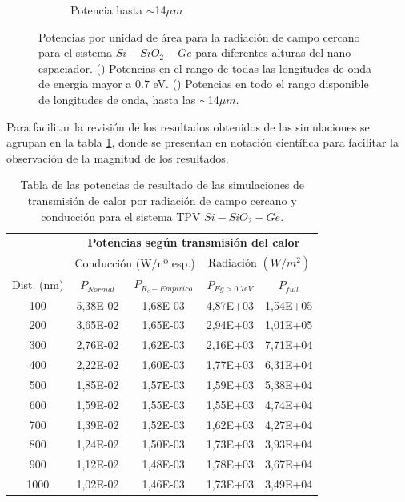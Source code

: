 \begin{figure}[H]
\begin{subfigure}[b]{0.49\textwidth}
	\caption{Potencia hasta $\sim$14$\mu m$}
	\label{fig:p_full_SiGe}
\end{subfigure}
	\caption[Potencias por unidad de área para la radiación de campo cercano para el sistema $Si-SiO_2-Ge$ para diferentes alturas del nano-espaciador]{Potencias por unidad de área para la radiación de campo cercano para el sistema $Si-SiO_2-Ge$ para diferentes alturas del nano-espaciador. () Potencias en el rango de todas las longitudes de onda de energía mayor a 0.7 eV. () Potencias en todo el rango disponible de longitudes de onda, hasta las $\sim$14$\mu m$.}
	\label{fig:p_SiGe}
\end{figure}
Para facilitar la revisión de los resultados obtenidos de las simulaciones se agrupan en la tabla \ref{tab:SiSiO2Ge}, donde se presentan en notación científica para facilitar la observación de la magnitud de los resultados.
\begin{table}[H]
	\centering
		\begin{tabular}{|c||c|c||c|c|}
		\hline
\multirow{2}{*}{ }& \multicolumn{4}{c|}{\textbf{\large Potencias según transmisión del calor}}\\ \cline{2-5}
& \multicolumn{2}{c||}{Conducción (W/nº esp.)}& \multicolumn{2}{c|}{Radiación $(W/m^2)$}\\ \hline
Dist. (nm)&$P_{Normal}$&$P_{R_c-Empirico}$&$P_{Eg>0.7eV}$&$P_{full}$\\ \hline \hline
100&5,38E-02&1,68E-03&4,87E+03&1,54E+05\\ \hline 
200&3,65E-02&1,65E-03&2,94E+03&1,01E+05\\ \hline 
300&2,76E-02&1,62E-03&2,16E+03&7,71E+04\\ \hline 
400&2,22E-02&1,60E-03&1,77E+03&6,31E+04\\ \hline 
500&1,85E-02&1,57E-03&1,59E+03&5,38E+04\\ \hline 
600&1,59E-02&1,55E-03&1,55E+03&4,74E+04\\ \hline 
700&1,39E-02&1,52E-03&1,62E+03&4,27E+04\\ \hline 
800&1,24E-02&1,50E-03&1,73E+03&3,93E+04\\ \hline 
900&1,12E-02&1,48E-03&1,78E+03&3,67E+04\\ \hline 
1000&1,02E-02&1,46E-03&1,73E+03&3,49E+04\\ \hline 
		\end{tabular}
	\caption{Tabla de las potencias de resultado de las simulaciones de transmisión de calor por radiación de campo cercano y conducción para el sistema TPV $Si-SiO_2-Ge$.}
	\label{tab:SiSiO2Ge}
\end{table}
